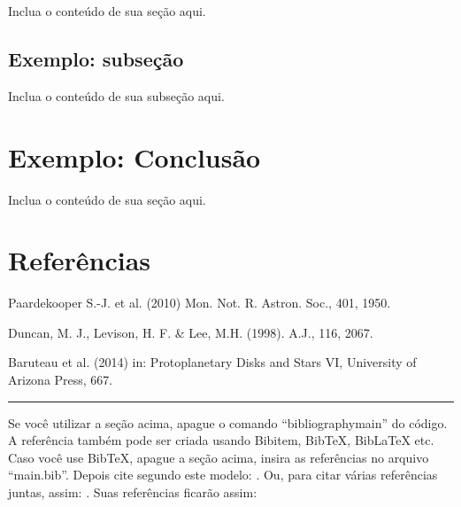 \documentclass[12pt,a4paper,twoside]{article}
\begin{document}
 Inclua o conteúdo de sua seção aqui. \\ %

\subsection{Exemplo: subseção} %

 Inclua o conteúdo de sua subseção aqui. \\ %

\section{Exemplo: Conclusão} %

Inclua o conteúdo de sua seção aqui. \\ %

\section*{Referências} %

\noindent Paardekooper S.-J. et al. (2010) Mon. Not. R. Astron. Soc., 401,
1950. %

\noindent Duncan, M. J., Levison, H. F. \& Lee, M.H. (1998). A.J., 116, 2067. %

\noindent Baruteau et al. (2014) in: Protoplanetary Disks and Stars VI, University of Arizona Press, 667. %

\vspace{\baselineskip} \hrule

\vspace{2\baselineskip}

Se você utilizar a seção acima, apague o comando ``bibliography{main}'' do código. A referência também pode ser criada usando Bibitem, BibTeX, BibLaTeX etc. Caso você use BibTeX, apague a seção acima, insira as referências no arquivo ``main.bib''. Depois cite segundo este modelo: \cite{greenwade93}. Ou, para citar várias referências juntas, assim: \cite{greenwade93,wikimedia-latex}. Suas referências ficarão assim:


\end{document}
